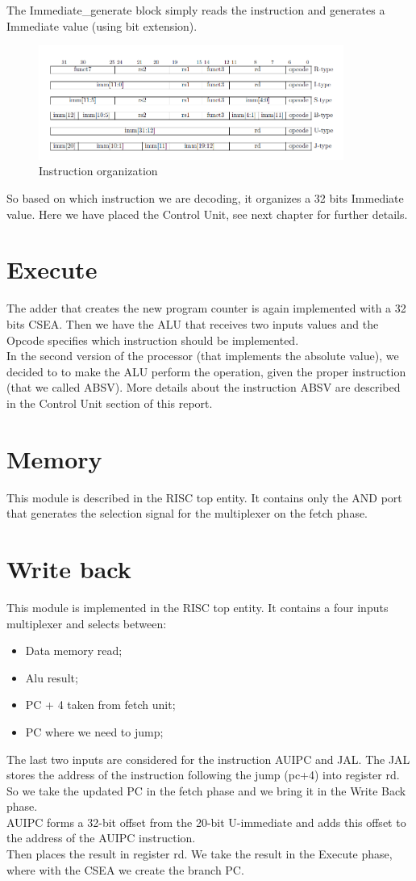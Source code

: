 The Immediate\_generate block simply reads the instruction and generates a Immediate value (using bit extension).
\begin{figure}[h!]
	\centering
	\includegraphics[width=10cm]{./images/immediate_gen}
	\caption{Instruction organization}
	\label{fig2.4}
\end{figure} 
So based on which instruction we are decoding, it organizes a 32 bits Immediate value.
Here we have placed the Control Unit, see next chapter for further details.
\section{Execute}
The adder that creates the new program counter is again implemented with a 32 bits CSEA.
Then we have the ALU that receives two inputs values and the Opcode specifies which instruction should be implemented.\\

In the second version of the processor (that implements the absolute value), we decided to to make the ALU perform the operation, given the proper instruction (that we called ABSV).
More details about the instruction ABSV are described in the Control Unit section of this report.\\

\section{Memory}
This module is described in the RISC top entity. It contains only the AND port that generates the selection signal for the multiplexer on the fetch phase.
\section{Write back}
This module is implemented in the RISC top entity. It contains a four inputs multiplexer and selects between:
\begin{itemize}
	\item Data memory read;
	\item Alu result;
	\item PC + 4 taken from fetch unit;
	\item PC where we need to jump;
\end{itemize}
The last two inputs are considered for the instruction AUIPC and JAL.
The JAL stores the address of the instruction following the jump (pc+4) into register rd.\\
So we take the updated PC in the fetch phase and we bring it in the Write Back phase.\\
AUIPC forms a 32-bit offset from the 20-bit U-immediate and adds this offset to the address of the AUIPC instruction.\\
Then places the result in register rd. 
We take the result in the Execute phase, where with the CSEA we create the branch PC.